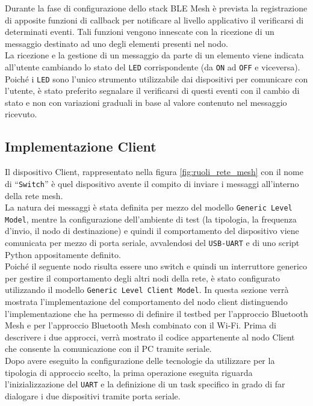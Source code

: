 \noindent Durante la fase di configurazione dello stack BLE Mesh è prevista la registrazione di apposite funzioni di callback per notificare al livello applicativo il verificarsi di determinati eventi. Tali funzioni vengono innescate con la ricezione di un messaggio destinato ad uno degli elementi presenti nel nodo.\\
La ricezione e la gestione di un messaggio da parte di un elemento viene indicata all'utente cambiando lo stato del \texttt{LED} corrispondente (da \texttt{ON} ad \texttt{OFF} e viceversa). Poiché i \texttt{LED} sono l'unico strumento utilizzabile dai dispositivi per comunicare con l'utente, è stato preferito segnalare il verificarsi di questi eventi con il cambio di stato e non con variazioni graduali in base al valore contenuto nel messaggio ricevuto.

\subsection{Implementazione Client}
Il dispositivo Client, rappresentato nella figura \ref{fig:ruoli_rete_mesh} con il nome di ``\texttt{Switch}'' è quel dispositivo avente il compito di inviare i messaggi all'interno della rete mesh.\\
La natura dei messaggi è stata definita per mezzo del modello \texttt{Generic Level Model}, mentre la configurazione dell'ambiente di test (la tipologia, la frequenza d'invio, il nodo di destinazione) e quindi il comportamento del dispositivo viene comunicata per mezzo di porta seriale, avvalendosi del \texttt{USB-UART} e di uno script Python appositamente definito.\\
Poiché il seguente nodo risulta essere uno switch e quindi un interruttore generico per gestire il comportamento degli altri nodi della rete, è stato configurato utilizzando il modello \texttt{Generic Level Client Model}.
In questa sezione verrà mostrata l'implementazione del comportamento del nodo client distinguendo l'implementazione che ha permesso di definire il testbed per l'approccio Bluetooth Mesh e per l'approccio Bluetooth Mesh combinato con il Wi-Fi. Prima di descrivere i due approcci, verrà mostrato il codice appartenente al nodo Client che consente la comunicazione con il PC tramite seriale.\\

\noindent Dopo avere eseguito la configurazione delle tecnologie da utilizzare per la tipologia di approccio scelto, la prima operazione eseguita riguarda l'inizializzazione del \texttt{UART} e la definizione di un task specifico in grado di far dialogare i due dispositivi tramite porta seriale.\\

